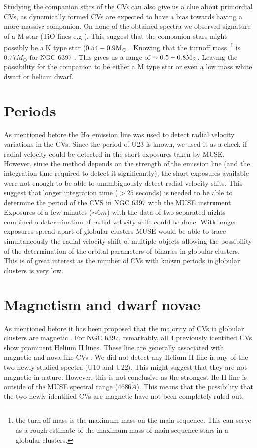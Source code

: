 Studying the companion stars of the CVs can also give us a clue about primordial CVs, as dynamically formed CVs are expected to have a bias towards having a more massive companion. On none of the obtained spectra we observed signature of a M star (TiO lines e.g \citep{Marsh_secondary_1990}). This suggest that the companion stars might possibly be a K type star ($0.54 - 0.9 \text M _\odot$ \citep{gray2005observation}. Knowing that the turnoff mass~\footnote{the turn off mass is the maximum mass on the main sequence. This can serve as a rough estimate of the maximum mass of main sequence stars in a globular clusters.} is $0.77 M_\odot$ for NGC 6397 \citep{de_marco_spectroscopic_2005}. This gives us a range of $\sim 0.5 - 0.8 \text M _\odot$. Leaving the possibility for the companion to be either a M type star or even a low mass white dwarf or helium dwarf.

\section{Periods}

As mentioned before the H$\alpha$ emission line was used to detect radial velocity variations in the CVs. Since the period of U23 is known, we used it as a check if radial velocity could be detected in the short exposures taken by MUSE. However, since the method depends on the strength of the emission line (and the integration time required to detect it significantly), the short exposures available were not enough to be able to unambiguously detect radial velocity shits. This suggest that longer integration time ($> 25$ seconds) is needed to be able to determine the period of the CVS in NGC 6397 with the MUSE instrument. Exposures of a few minutes ($\sim 6 m$) with the data of two separated nights combined a determination of radial velocity shift could be done. With longer exposures spread apart of globular clusters MUSE would be able to trace simultaneously the radial velocity shift of multiple objects allowing the possibility of the determination of the orbital parameters of binaries in globular clusters. This is of great interest as the number of CVs with known periods in globular clusters is very low.  

\section{Magnetism and dwarf novae}

 As mentioned before it has been proposed that the majority of CVs in globular clusters are magnetic \citep{grindlay_magnetic_1999}. For NGC 6397, remarkably, all 4 previously identified CVs show prominent Helium II lines. These line are generally associated with magnetic and nova-like CVs \citep{echevarria_statistical_1988}. We did not detect any Helium II line in any of the two newly studied spectra (U10 and U22). This might suggest that they are not magnetic in nature. However, this is not conclusive as the strongest He II line is outside of the MUSE spectral range ($4686 \mathring{A}$). This means that the possibility that the two newly identified CVs are magnetic have not been completely ruled out. 

